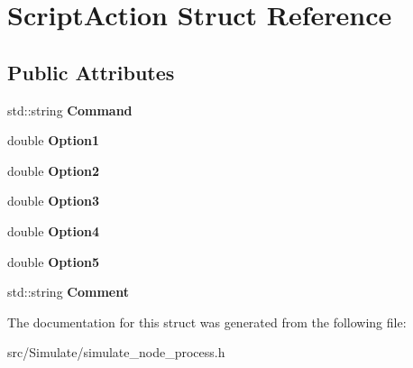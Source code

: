 \hypertarget{structScriptAction}{}\section{Script\+Action Struct Reference}
\label{structScriptAction}
\subsection*{Public Attributes}
\begin{DoxyCompactItemize}
\item 
\mbox{\label{structScriptAction_a2387a0b3c761b7b1bac5b2b4f1a108d8}} 
std\+::string {\bfseries Command}
\item 
\mbox{\label{structScriptAction_a83af75d687c7e3dea931d8790c6915ad}} 
double {\bfseries Option1}
\item 
\mbox{\label{structScriptAction_a2473b604f474cc187a8d38b64a67ac26}} 
double {\bfseries Option2}
\item 
\mbox{\label{structScriptAction_ab29e513b6e0504bbdd85b1b0b7ab419b}} 
double {\bfseries Option3}
\item 
\mbox{\label{structScriptAction_a8c817722910c8f70744466de3020b676}} 
double {\bfseries Option4}
\item 
\mbox{\label{structScriptAction_a660314c1a66a39e13c3c82085c2c9a55}} 
double {\bfseries Option5}
\item 
\mbox{\label{structScriptAction_aadc632505b54ff8acdfae53fa009876a}} 
std\+::string {\bfseries Comment}
\end{DoxyCompactItemize}


The documentation for this struct was generated from the following file\+:\begin{DoxyCompactItemize}
\item 
src/\+Simulate/simulate\+\_\+node\+\_\+process.\+h\end{DoxyCompactItemize}
